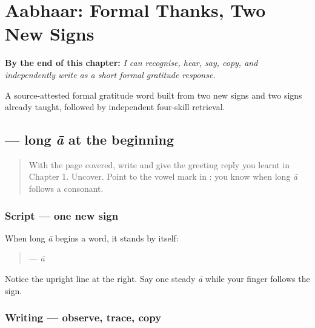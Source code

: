 
\chapter{Aabhaar: Formal Thanks, Two New Signs}
\label{ch:mw-aabhaar}

\begin{chapteropening}
\textbf{By the end of this chapter:} \emph{I can recognise, hear, say, copy, and independently write  as a short formal gratitude response.}

A source-attested formal gratitude word built from two new signs and two signs already taught, followed by independent four-skill retrieval.
\end{chapteropening}

\section[\texorpdfstring{\mw{आ} (ā)}{आ (ā)}]{ — long \emph{ā} at the beginning}

\label{lesson:MW-W02-aa-independent}



\begin{quote}
With the page covered, write \textbf{} and give the greeting reply you learnt in Chapter 1. Uncover. Point to the vowel mark in \textbf{}: you know \textbf{} when long \emph{ā} follows a consonant.
\end{quote}

\subsection*{Script — one new sign}
When long \emph{ā} begins a word, it stands by itself:

\begin{quote}
\textbf{} — \emph{ā}
\end{quote}

Notice the upright line at the right. Say one steady \emph{ā} while your finger follows the sign.

\subsection*{Writing — observe, trace, copy}

